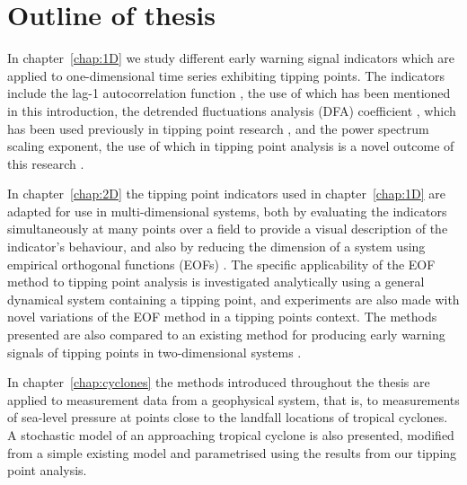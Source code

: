 \section{Outline of thesis}
\label{sec:intro:outline}

In chapter~\ref{chap:1D} we study different early warning signal indicators which are applied to one-dimensional time series exhibiting tipping points. The indicators include the lag-1 autocorrelation function \citep{held2004,dakos2008}, the use of which has been mentioned in this introduction, the detrended fluctuations analysis (DFA) coefficient \citep{kantelhardt2001}, which has been used previously in tipping point research \citep{livina2007}, and the power spectrum scaling exponent, the use of which in tipping point analysis is a novel outcome of this research \citep{prettyman2018}. {}

In chapter~\ref{chap:2D} the tipping point indicators used in chapter~\ref{chap:1D} are adapted for use in multi-dimensional systems, both by evaluating the indicators simultaneously at many points over a field to provide a visual description of the indicator's behaviour, and also by reducing the dimension of a system using empirical orthogonal functions (EOFs) \citep{held2004}. The specific applicability of the EOF method to tipping point analysis is investigated analytically using a general dynamical system containing a tipping point, and experiments are also made with novel variations of the EOF method in a tipping points context. The methods presented are also compared to an existing method for producing early warning signals of tipping points in two-dimensional systems \citep{williamson2015}. 

In chapter~\ref{chap:cyclones} the methods introduced throughout the thesis are applied to measurement data from a geophysical system, that is, to measurements of sea-level pressure at points close to the landfall locations of tropical cyclones. A stochastic model of an approaching tropical cyclone is also presented, modified from a simple existing model \citep{holland1980} and parametrised using the results from our tipping point analysis. 
